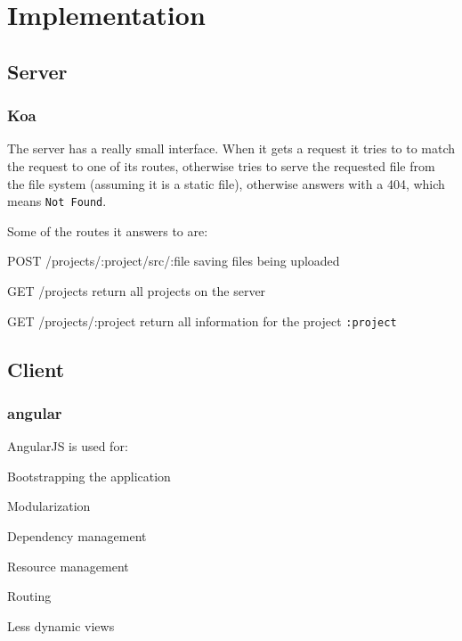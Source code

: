 
\section{Implementation}
\label{implementation}

\subsection{Server}
\label{used-tech}

\subsubsection{Koa}
\label{koa}

The server has a really small interface.
When it gets a request it tries to to match the request to one of its routes, otherwise tries to serve the requested file from the file system (assuming it is a static file), otherwise answers with a 404, which means \texttt{Not Found}.

Some of the routes it answers to are:
\begin{description*} 
  \item[POST /projects/:project/src/:file]
    saving files being uploaded
  \item[GET /projects]
    return all projects on the server
  \item[GET /projects/:project]
    return all information for the project \texttt{:project}
\end{description*}

\subsection{Client}
\label{used-tech}

\subsubsection{angular}
\label{angular}

AngularJS is used for:

\begin{itemize*}
  \item Bootstrapping the application
  \item Modularization
  \item Dependency management
  \item Resource management
  \item Routing
  \item Less dynamic views
\end{itemize*}

